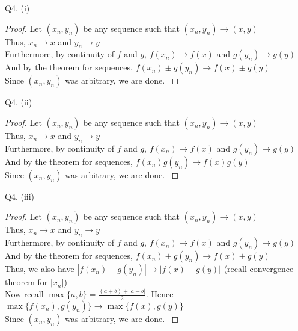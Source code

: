\documentclass[aspectratio=169]{beamer}
\newcommand{\norm}[1]{|#1|}
\begin{document}
\begin{frame}{Q4. (i)}
\begin{proof}
     {
        Let $(x_n,y_n)$ be any sequence such that $(x_n,y_n) \to (x,y)$\\[1mm]
    }
     {
        Thus, $x_n \to x$ and $y_n \to y$\\[1mm]
    }
     {
        Furthermore, by continuity of $f$ and $g$, $f(x_n) \to f(x)$ and $g(y_n) \to g(y)$\\[1mm]
    }
     {
        And by the theorem for sequences, $f(x_n)\pm g(y_n) \to f(x)\pm g(y)$\\[1mm]
    }
     {
        Since $(x_n,y_n)$ was arbitrary, we are done.
    }
\end{proof}
\end{frame}

\begin{frame}{Q4. (ii)}
\begin{proof}
     {
        Let $(x_n,y_n)$ be any sequence such that $(x_n,y_n) \to (x,y)$\\[1mm]
    }
     {
        Thus, $x_n \to x$ and $y_n \to y$\\[1mm]
    }
     {
        Furthermore, by continuity of $f$ and $g$, $f(x_n) \to f(x)$ and $g(y_n) \to g(y)$\\[1mm]
    }
     {
        And by the theorem for sequences, $f(x_n)g(y_n) \to f(x)g(y)$\\[1mm]
    }
     {
        Since $(x_n,y_n)$ was arbitrary, we are done.
    }
\end{proof}
\end{frame}

\begin{frame}{Q4. (iii)}
\begin{proof}
     {
        Let $(x_n,y_n)$ be any sequence such that $(x_n,y_n) \to (x,y)$\\[1mm]
    }
     {
        Thus, $x_n \to x$ and $y_n \to y$\\[1mm]
    }
     {
        Furthermore, by continuity of $f$ and $g$, $f(x_n) \to f(x)$ and $g(y_n) \to g(y)$\\[1mm]
    }
     {
        And by the theorem for sequences, $f(x_n)\pm g(y_n) \to f(x)\pm g(y)$\\[1mm]
    }
     {
        Thus, we also have $\norm{f(x_n)-g(y_n)} \to \norm{f(x)-g(y)}$ (recall convergence theorem for $\norm{x_n}$)\\[1mm]
    }
     {
        Now recall $\max\{a,b\} = \frac{(a+b)+|a-b|}{2}$. Hence $\max\{f(x_n),g(y_n)\} \to \max\{f(x),g(y)\}$\\[1mm]
    }
     {
        Since $(x_n,y_n)$ was arbitrary, we are done.
    }
\end{proof}
\end{frame}
\end{document}

